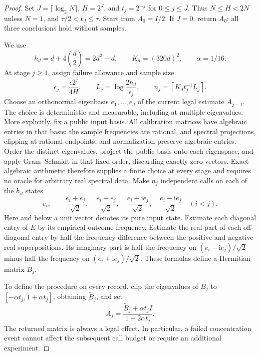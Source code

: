 \begin{proof}
Set $J=\lceil\log_2N\rceil$, $H=2^J$, and $t_j=2^{-j}$ for
$0\le j\le J$.  Thus $N\le H<2N$ unless $N=1$, and
$\tau/2<t_J\le\tau$.  Start from $A_0=I/2$.  If $J=0$, return
$A_0$: all three conclusions hold without samples.

We use
\[
 h_d=d+4\binom d2=2d^2-d,
 \qquad K_d=(320d)^2,
 \qquad \alpha=1/16.
\]
At stage $j\ge1$, assign failure allowance and sample size
\begin{equation}\label{eq:matrixcalibrationbudget77}
 \epsilon_j=\frac{\epsilon 2^j}{4H},\qquad
 L_j=\log\frac{2h_d}{\epsilon_j},\qquad
 n_j=\left\lceil K_d t_j^{-1}L_j\right\rceil.
\end{equation}
Choose an orthonormal eigenbasis $e_1,\ldots,e_d$ of the current
legal estimate $A_{j-1}$.  The choice is deterministic and measurable,
including at multiple eigenvalues.  More explicitly, fix a public
input basis.  All calibration matrices have algebraic entries in that
basis: the sample frequencies are rational, and spectral projections,
clipping at rational endpoints, and normalization preserve algebraic
entries.  Order the distinct eigenvalues, project the public basis
onto each eigenspace, and apply Gram--Schmidt in that fixed order,
discarding exactly zero vectors.  Exact algebraic arithmetic
therefore supplies a finite choice at every stage and requires no
oracle for arbitrary real spectral data.
Make $n_j$ independent calls on each of the $h_d$ states
\begin{equation}\label{eq:matrixcalibrationstates77}
 e_i,\qquad
 \frac{e_i+e_j}{\sqrt2},\quad
 \frac{e_i-e_j}{\sqrt2},\quad
 \frac{e_i+\mathrm i e_j}{\sqrt2},\quad
 \frac{e_i-\mathrm i e_j}{\sqrt2}
 \quad(i<j).
\end{equation}
Here and below a unit vector denotes its pure input state.  Estimate
each diagonal entry of $E$ by its empirical outcome frequency.
Estimate the real part of each off-diagonal entry by half the
frequency difference between the positive and negative real
superpositions.  Its imaginary part is half the frequency on
$(e_i-\mathrm i e_j)/\sqrt2$ minus half the frequency on
$(e_i+\mathrm i e_j)/\sqrt2$.  These formulas define a Hermitian
matrix $B_j$.

To define the procedure on every record, clip the eigenvalues of
$B_j$ to $[-\alpha t_j,1+\alpha t_j]$, obtaining $\widetilde B_j$,
and set
\begin{equation}\label{eq:matrixcalibrationupdate77}
 A_j=\frac{\widetilde B_j+\alpha t_jI}{1+2\alpha t_j}.
\end{equation}
The returned matrix is always a legal effect.  In particular, a
failed concentration event cannot affect the subsequent call budget
or require an additional experiment.


\end{proof}
